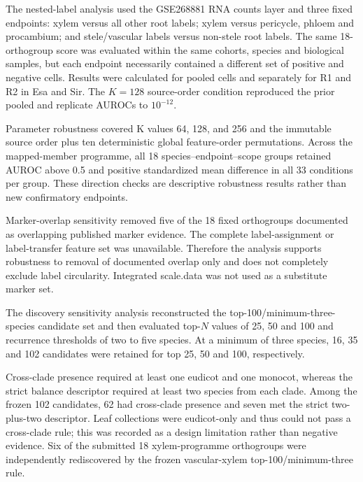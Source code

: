 
The nested-label analysis used the GSE268881 RNA counts layer and three fixed endpoints: xylem versus all other root labels; xylem versus pericycle, phloem and procambium; and stele/vascular labels versus non-stele root labels. The same 18-orthogroup score was evaluated within the same cohorts, species and biological samples, but each endpoint necessarily contained a different set of positive and negative cells. Results were calculated for pooled cells and separately for R1 and R2 in Esa and Sir. The $K=128$ source-order condition reproduced the prior pooled and replicate AUROCs to $10^{-12}$.

Parameter robustness covered K values 64, 128, and 256 and the immutable source order plus ten deterministic global feature-order permutations. Across the mapped-member programme, all 18 species--endpoint--scope groups retained AUROC above 0.5 and positive standardized mean difference in all 33 conditions per group. These direction checks are descriptive robustness results rather than new confirmatory endpoints.

Marker-overlap sensitivity removed five of the 18 fixed orthogroups documented as overlapping published marker evidence. The complete label-assignment or label-transfer feature set was unavailable. Therefore the analysis supports robustness to removal of documented overlap only and does not completely exclude label circularity. Integrated scale.data was not used as a substitute marker set.


The discovery sensitivity analysis reconstructed the top-100/minimum-three-species candidate set and then evaluated top-$N$ values of 25, 50 and 100 and recurrence thresholds of two to five species. At a minimum of three species, 16, 35 and 102 candidates were retained for top 25, 50 and 100, respectively.

Cross-clade presence required at least one eudicot and one monocot, whereas the strict balance descriptor required at least two species from each clade. Among the frozen 102 candidates, 62 had cross-clade presence and seven met the strict two-plus-two descriptor. Leaf collections were eudicot-only and thus could not pass a cross-clade rule; this was recorded as a design limitation rather than negative evidence. Six of the submitted 18 xylem-programme orthogroups were independently rediscovered by the frozen vascular-xylem top-100/minimum-three rule.

